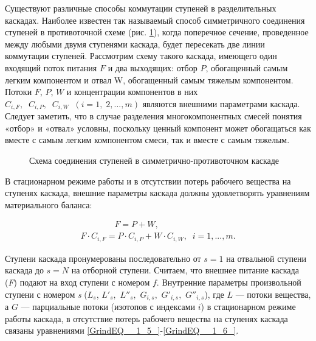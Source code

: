 Существуют различные способы коммутации ступеней в разделительных каскадах. Наиболее известен так называемый способ симметричного соединения ступеней в противоточной схеме (рис. \ref{1_2}), когда поперечное сечение, проведенное между любыми двумя ступенями каскада, будет пересекать две линии коммутации ступеней. Рассмотрим схему такого каскада, имеющего один входящий поток питания $F$ и два выходящих: отбор $P$, обогащенный самым легким компонентом и отвал W, обогащенный самым тяжелым компонентом. Потоки $F$, $P$, $W$ и концентрации компонентов в них $C_{i,F} ,\; \; C_{i,P} ,\; \; C_{i,W} \; \; (i=1,\; 2,...,m)$ являются внешними параметрами каскада. Следует заметить, что в случае разделения многокомпонентных смесей понятия «отбор» и «отвал» условны, поскольку ценный компонент может обогащаться как вместе с самым легким компонентом смеси, так и вместе с самым тяжелым.

\begin{figure}[ht]
  \caption{Схема соединения ступеней в симметрично-противоточном каскаде}\label{1_2}
\end{figure}

В стационарном режиме работы и в отсутствии потерь рабочего вещества на ступенях каскада, внешние параметры каскада должны удовлетворять уравнениям материального баланса:

\begin{equation} \label{GrindEQ__1_21_} 
  \begin{array}{l} {\quad \quad \quad \quad F=P+W,} \\ {F \cdot C_{i,F} =P \cdot C_{i,P} +W \cdot C_{i,W} ,\; \; i=1,...,m.} \end{array} 
\end{equation} 

Ступени каскада пронумерованы последовательно от $s=1$ на отвальной ступени каскада до $s=N$ на отборной ступени. Считаем, что внешнее питание каскада (\textit{F}) подают на вход ступени с номером $f$. Внутренние параметры произвольной ступени с номером \textit{s} ($L_{s} $, $L'_{s} ,$ $L''_{s} ,$ $G_{i,s} ,$ $G'_{i,s} ,$ $G''_{i,s} $), где $L$ --- потоки вещества, а $G$ --- парциальные потоки (изотопов с индексами $i$) в стационарном режиме работы каскада, в отсутствие потерь рабочего вещества на ступенях каскада связаны уравнениями \ref{GrindEQ__1_5_}-\ref{GrindEQ__1_6_}.

